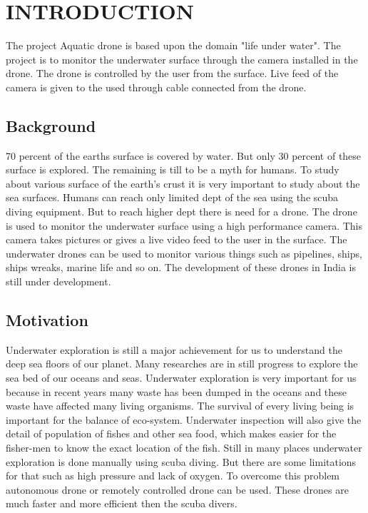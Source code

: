 \chapter{INTRODUCTION}\thispagestyle{EmptyHeader}
\label{chp:1}

The project Aquatic drone is based upon the domain "life under water". The project is to monitor the underwater surface through the camera installed in the drone. The drone is controlled by the user from the surface. Live feed of the camera is given to the used through cable connected from the drone.

\section{Background}
70 percent of the earths surface is covered by water. But only 30 percent of these surface is explored. The remaining is till to be a myth for humans. To study about various surface of the earth's crust it is very important to study about the sea surfaces. Humans can reach only limited dept of the sea using the scuba diving equipment. But to reach higher dept there is need for a drone. The drone is used to monitor the underwater surface using a high performance camera. This camera takes pictures or gives a live video feed to the user in the surface. The underwater drones can be used to monitor various things such as pipelines, ships, ships wreaks, marine life and so on. The development of these drones in India is still under development.

\section{Motivation}
Underwater exploration is still a major achievement for us to understand the deep sea floors of our planet. Many researches are in still progress to explore the sea bed of our oceans and seas. Underwater exploration is very important for us because in recent years many waste has been dumped in the oceans and these waste have affected many living organisms. The survival of every living being is important for the balance of eco-system. Underwater inspection will also give the detail of population of fishes and other sea food, which makes easier for the fisher-men to know the exact location of the fish. Still in many places underwater exploration is done manually using scuba diving. But there are some limitations for that such as high pressure and lack of oxygen. To overcome this problem autonomous drone or remotely controlled drone can be used. These drones are much faster and more efficient then the scuba divers.

